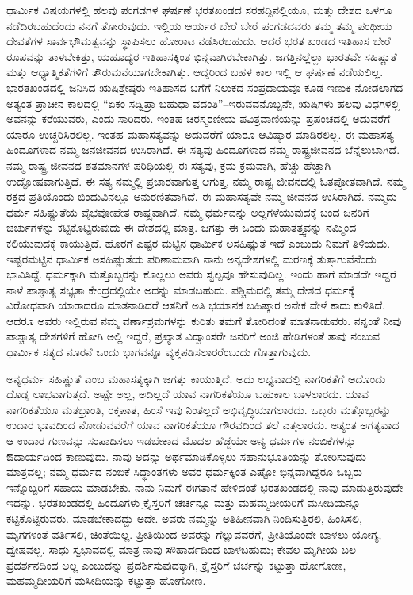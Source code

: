 ಧಾರ್ಮಿಕ ವಿಷಯಗಳಲ್ಲಿ ಹಲವು ಪಂಗಡಗಳ ಘರ್ಷಣೆ ಭರತಖಂಡದ ಸರಹದ್ದಿನಲ್ಲಿಯೂ, ಮತ್ತು ದೇಶದ ಒಳಗೂ ನಡೆದಿರಬಹುದೆಂದು ನನಗೆ ತೋರುವುದು. ಇಲ್ಲಿಯ ಆರ್ಯರ ಬೇರೆ ಬೇರೆ ಪಂಗಡದವರು ತಮ್ಮ ತಮ್ಮ ಪಂಥೀಯ ದೇವತೆಗಳ ಸಾರ್ವಭೌಮತ್ವವನ್ನು ಸ್ಥಾಪಿಸಲು ಹೋರಾಟ ನಡೆಸಿರಬಹುದು. ಆದರೆ ಭರತ ಖಂಡದ ಇತಿಹಾಸ ಬೇರೆ ರೂಪವನ್ನು ತಾಳಬೇಕಿತ್ತು, ಯಹೂದ್ಯರ ಇತಿಹಾಸಕ್ಕಿಂತ ಭಿನ್ನವಾಗಿರಬೇಕಾಗಿತ್ತು. ಜಗತ್ತಿನಲ್ಲೆಲ್ಲಾ ಭಾರತವೇ ಸಹಿಷ್ಣುತೆ ಮತ್ತು ಆಧ್ಯಾತ್ಮಿಕತೆಗಳಿಗೆ ತೌರುಮನೆಯಾಗಬೇಕಾಗಿತ್ತು. ಆದ್ದರಿಂದ ಬಹಳ ಕಾಲ ಇಲ್ಲಿ ಆ ಘರ್ಷಣೆ ನಡೆಯಲಿಲ್ಲ. ಭಾರತಖಂಡದಲ್ಲಿ ಜನಿಸಿದ ಋಷಿಶ್ರೇಷ್ಠರು ಇತಿಹಾಸದ ಬಗೆಗೆ ನಿಲುಕದ ಸಂಪ್ರದಾಯವೂ ಕೂಡ ಇಣುಕಿ ನೋಡಲಾಗದ ಅತ್ಯಂತ ಪ್ರಾಚೀನ ಕಾಲದಲ್ಲಿ “ಏಕಂ ಸದ್ವಿಪ್ರಾ ಬಹುಧಾ ವದಂತಿ”–ಇರುವವನೊಬ್ಬನೇ, ಋಷಿಗಳು ಹಲವು ವಿಧಗಳಲ್ಲಿ ಅವನನ್ನು ಕರೆಯುವರು, ಎಂದು ಸಾರಿದರು. ಇಂತಹ ಚಿರಸ್ಮರಣೀಯ ಪವಿತ್ರವಾಣಿಯನ್ನು ಪ್ರಪಂಚದಲ್ಲಿ ಅದುವರೆಗೆ ಯಾರೂ ಉಚ್ಚರಿಸಿರಲಿಲ್ಲ. ಇಂತಹ ಮಹಾಸತ್ಯವನ್ನು ಅದುವರೆಗೆ ಯಾರೂ ಆವಿಷ್ಕಾರ ಮಾಡಿರಲಿಲ್ಲ. ಈ ಮಹಾಸತ್ಯ ಹಿಂದೂಗಳಾದ ನಮ್ಮ ಜನಜೀವನದ ಉಸಿರಾಗಿದೆ. ಈ ಸತ್ಯವು ಹಿಂದೂಗಳಾದ ನಮ್ಮ ರಾಷ್ಟ್ರಜೀವನದ ಬೆನ್ನೆಲುಬಾಗಿದೆ. ನಮ್ಮ ರಾಷ್ಟ್ರ ಜೀವನದ ಶತಮಾನಗಳ ಪರಿಧಿಯಲ್ಲಿ ಈ ಸತ್ಯವು, ಕ್ರಮ ಕ್ರಮವಾಗಿ, ಹೆಚ್ಚು ಹೆಚ್ಚಾಗಿ ಉದ್ಘೋಷವಾಗುತ್ತಿದೆ. ಈ ಸತ್ಯ ನಮ್ಮಲ್ಲಿ ಪ್ರಚಾರವಾಗುತ್ತ ಆಗುತ್ತ, ನಮ್ಮ ರಾಷ್ಟ್ರ ಜೀವನದಲ್ಲಿ ಓತಪ್ರೋತವಾಗಿದೆ. ನಮ್ಮ ರಕ್ತದ ಪ್ರತಿಯೊಂದು ಬಿಂದುವಿನಲ್ಲೂ ಅನುರಣಿತವಾಗಿದೆ. ಈ ಮಹಾಸತ್ಯವೇ ನಮ್ಮ ಜೀವನದ ಉಸಿರಾಗಿದೆ. ನಮ್ಮದು ಧರ್ಮ ಸಹಿಷ್ಣುತೆಯ ವೈಭವೋಪೇತ ರಾಷ್ಟ್ರವಾಗಿದೆ. ನಮ್ಮ ಧರ್ಮವನ್ನು ಅಲ್ಲಗಳೆಯುವುದಕ್ಕೆ ಬಂದ ಜನರಿಗೆ ಚರ್ಚುಗಳನ್ನು ಕಟ್ಟಿಕೊಟ್ಟಿರುವುದು ಈ ದೇಶದಲ್ಲಿ ಮಾತ್ರ. ಜಗತ್ತು ಈ ಒಂದು ಮಹಾತತ್ತ್ವವನ್ನು ನಮ್ಮಿಂದ ಕಲಿಯುವುದಕ್ಕೆ ಕಾಯುತ್ತಿದೆ. ಹೊರಗೆ ಎಷ್ಟರ ಮಟ್ಟಿನ ಧಾರ್ಮಿಕ ಅಸಹಿಷ್ಣುತೆ ಇದೆ ಎಂಬುದು ನಿಮಗೆ ತಿಳಿಯದು. ಇಷ್ಟರಮಟ್ಟಿನ ಧಾರ್ಮಿಕ ಅಸಹಿಷ್ಣುತೆಯ ಪರಿಣಾಮವಾಗಿ ನಾನು ಅನ್ಯದೇಶಗಳಲ್ಲಿ ಮರಣಕ್ಕೆ ತುತ್ತಾಗುವೆನೆಂದು ಭಾವಿಸಿದ್ದೆ. ಧರ್ಮಕ್ಕಾಗಿ ಮತ್ತೊಬ್ಬರನ್ನು ಕೊಲ್ಲಲು ಅವರು ಸ್ವಲ್ಪವೂ ಹೇಸುವುದಿಲ್ಲ. ಇಂದು ಹಾಗೆ ಮಾಡದೇ ಇದ್ದರೆ ನಾಳೆ ಪಾಶ್ಚಾತ್ಯ ಸಭ್ಯತಾ ಕೇಂದ್ರದಲ್ಲಿಯೇ ಅದನ್ನು ಮಾಡಬಹುದು. ಪಶ್ಚಿಮದಲ್ಲಿ ತಮ್ಮ ದೇಶದ ಧರ್ಮಕ್ಕೆ ವಿರೋಧವಾಗಿ ಯಾರಾದರೂ ಮಾತನಾಡಿದರೆ ಆತನಿಗೆ ಅತಿ ಭಯಾನಕ ಬಹಿಷ್ಕಾರ ಅನೇಕ ವೇಳೆ ಕಾದು ಕುಳಿತಿದೆ. ಆದರೂ ಅವರು ಇಲ್ಲಿರುವ ನಮ್ಮ ವರ್ಣಾಶ್ರಮಗಳನ್ನು ಕುರಿತು ತಮಗೆ ತೋರಿದಂತೆ ಮಾತನಾಡುವರು. ನನ್ನಂತೆ ನೀವು ಪಾಶ್ಚಾತ್ಯ ದೇಶಗಳಿಗೆ ಹೋಗಿ ಅಲ್ಲಿ ಇದ್ದರೆ, ಪ್ರಖ್ಯಾತ ವಿದ್ವಾಂಸರೇ ಜನರಿಗೆ ಅಂಜಿ ಹೇಡಿಗಳಂತೆ ತಾವು ನಂಬುವ ಧಾರ್ಮಿಕ ಸತ್ಯದ ನೂರನೆ ಒಂದು ಭಾಗವನ್ನೂ ವ್ಯಕ್ತಪಡಿಸಲಾರರೆಂಬುದು ಗೊತ್ತಾಗುವುದು. 

ಅನ್ಯಧರ್ಮ ಸಹಿಷ್ಣುತೆ ಎಂಬ ಮಹಾಸತ್ಯಕ್ಕಾಗಿ ಜಗತ್ತು ಕಾಯುತ್ತಿದೆ. ಅದು ಲಭ್ಯವಾದಲ್ಲಿ ನಾಗರಿಕತೆಗೆ ಅದೊಂದು ದೊಡ್ಡ ಲಾಭವಾಗುತ್ತದೆ. ಅಷ್ಟೇ ಅಲ್ಲ, ಅದಿಲ್ಲದೆ ಯಾವ ನಾಗರಿಕತೆಯೂ ಬಹುಕಾಲ ಬಾಳಲಾರದು. ಯಾವ ನಾಗರಿಕತೆಯೂ ಮತಭ್ರಾಂತಿ, ರಕ್ತಪಾತ, ಹಿಂಸೆ ಇವು ನಿಂತಲ್ಲದೆ ಅಭಿವೃದ್ಧಿಯಾಗಲಾರದು. ಒಬ್ಬರು ಮತ್ತೊಬ್ಬರನ್ನು ಉದಾರ ಭಾವದಿಂದ ನೋಡುವವರೆಗೆ ಯಾವ ನಾಗರಿಕತೆಯೂ ಗೌರವದಿಂದ ತಲೆ ಎತ್ತಲಾರದು. ಅತ್ಯಂತ ಅಗತ್ಯವಾದ ಆ ಉದಾರ ಗುಣವನ್ನು ಸಂಪಾದಿಸಲು ಇಡಬೇಕಾದ ಮೊದಲ ಹೆಜ್ಜೆಯೇ ಅನ್ಯ ಧರ್ಮಗಳ ನಂಬಿಕೆಗಳನ್ನು ಔದಾರ್ಯದಿಂದ ಕಾಣುವುದು. ನಾವು ಅದನ್ನು ಅರ್ಥಮಾಡಿಕೊಳ್ಳಲು ಸಹಾನುಭೂತಿಯನ್ನು ತೋರಿಸುವುದು ಮಾತ್ರವಲ್ಲ; ನಮ್ಮ ಧರ್ಮದ ನಂಬಿಕೆ ಸಿದ್ಧಾಂತಗಳು ಅವರ ಧರ್ಮಕ್ಕಿಂತ ಎಷ್ಟೋ ಭಿನ್ನವಾಗಿದ್ದರೂ ಒಬ್ಬರು ಇನ್ನೊಬ್ಬರಿಗೆ ಸಹಾಯ ಮಾಡಬೇಕು. ನಾನು ನಿಮಗೆ ಈಗತಾನೆ ಹೇಳಿದಂತೆ ಭರತಖಂಡದಲ್ಲಿ ನಾವು ಮಾಡುತ್ತಿರುವುದೇ ಇದನ್ನು. ಭರತಖಂಡದಲ್ಲಿ ಹಿಂದೂಗಳು ಕ್ರೈಸ್ತರಿಗೆ ಚರ್ಚನ್ನೂ ಮತ್ತು ಮಹಮ್ಮದೀಯರಿಗೆ ಮಸೀದಿಯನ್ನೂ ಕಟ್ಟಿಕೊಟ್ಟಿರುವರು. ಮಾಡಬೇಕಾದದ್ದು ಅದೇ. ಅವರು ನಮ್ಮನ್ನು ಅತಿ\break ಹೀನವಾಗಿ ನಿಂದಿಸುತ್ತಿರಲಿ, ಹಿಂಸಿಸಲಿ, ಮೃಗಗಳಂತೆ ವರ್ತಿಸಲಿ, ಚಿಂತೆಯಿಲ್ಲ. ಪ್ರೀತಿಯಿಂದ ಅವರನ್ನು ಗೆಲ್ಲುವವರೆಗೆ, ಪ್ರೀತಿಯೊಂದೇ ಬಾಳಲು ಯೋಗ್ಯ, ದ್ವೇಷವಲ್ಲ. ಸಾಧು ಸ್ವಭಾವದಲ್ಲಿ ಮಾತ್ರ ನಾವು ಸೌಹಾರ್ದದಿಂದ ಬಾಳಬಹುದು; ಕೇವಲ ಮೃಗೀಯ ಬಲ ಪ್ರದರ್ಶನದಿಂದ ಅಲ್ಲ ಎಂಬುದನ್ನು ಪ್ರದರ್ಶಿಸುವುದಕ್ಕಾಗಿ, ಕ್ರೈಸ್ತರಿಗೆ ಚರ್ಚನ್ನು ಕಟ್ಟುತ್ತಾ ಹೋಗೋಣ, ಮಹಮ್ಮದೀಯರಿಗೆ ಮಸೀದಿಯನ್ನು ಕಟ್ಟುತ್ತಾ ಹೋಗೋಣ. 

